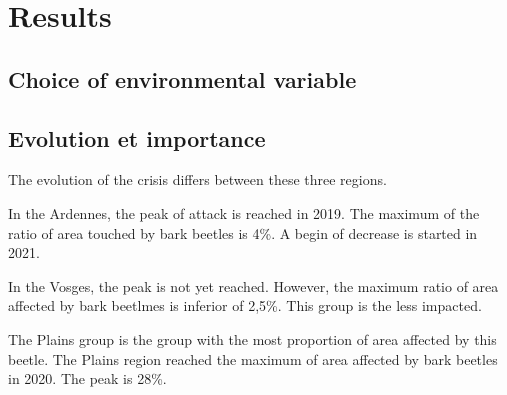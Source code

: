 \documentclass[3p,procedia]{elsarticle}
\begin{document}
	






\section{Results}

\subsection{Choice of environmental variable}

\subsection{Evolution et importance}
The evolution of the crisis differs between these three regions.

In the Ardennes, the peak of attack is reached in 2019.
The maximum of the ratio of area touched by bark beetles is 4\%. 
A begin of decrease is started in 2021.

In the Vosges, the peak is not yet reached.
However, the maximum ratio of area affected by bark beetlmes is inferior of 2,5\%.
This group is the less impacted.


The Plains group is the group with the most  proportion of area affected by this beetle.
The Plains region reached the maximum of area affected by bark beetles in 2020. 
The peak is 28\%.

 


















\end{document}

